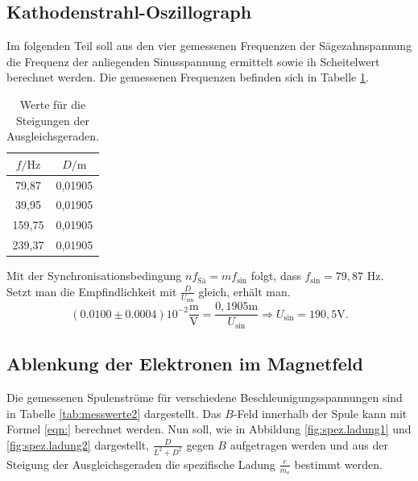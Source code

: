 \subsection{Kathodenstrahl-Oszillograph}
Im folgenden Teil soll aus den vier gemessenen Frequenzen der Sägezahnspannung die Frequenz der anliegenden Sinusspannung ermittelt sowie ih Scheitelwert berechnet werden. Die gemessenen Frequenzen befinden sich in Tabelle \ref{tab:frequenzen}.

\begin{table}
  \caption{Werte für die Steigungen der Ausgleichsgeraden.}
  \centering
  \label{tab:frequenzen}
  \begin{tabular}{c c}
    \toprule
    $f / \si{\Hz}$ & $D/\si{\meter}$ \\
    \midrule
79,87 & 0,01905 \\
39,95 & 0,01905\\
159,75 & 0,01905 \\
239,37 & 0,01905 \\
\bottomrule
\end{tabular}
\end{table}

Mit der Synchronisationsbedingung $n f_\mathrm{Sä}= m f_\mathrm{sin}$ folgt, dass $f_\mathrm{sin}=79,87$ \si{\Hz}.
Setzt man die Empfindlichkeit mit $\frac{D}{U_\mathrm{sin}}$ gleich, erhält man.
\begin{equation}
  (0.0100 \pm 0.0004)10^{-2}\frac{\si{\meter}}{\si{\volt}} = \frac{0,1905 \si{\meter}}{U_\mathrm{sin}}
\Rightarrow U_\mathrm{sin} = 190,5 \si{\volt}.
\end{equation}

\subsection{Ablenkung der Elektronen im Magnetfeld}
Die gemessenen Spulenströme für verschiedene Beschleunigungsspannungen sind in Tabelle \ref{tab:messwerte2} dargestellt. Das $B$-Feld innerhalb der Spule kann mit Formel \ref{eqn:} berechnet werden. Nun soll, wie in Abbildung \ref{fig:spez.ladung1} und \ref{fig:spez.ladung2} dargestellt, $\frac{D}{L^2+D^2}$ gegen $B$ aufgetragen werden und aus der Steigung der Ausgleichsgeraden die spezifische Ladung $\frac{e}{m_\mathrm{e}}$ bestimmt werden.

